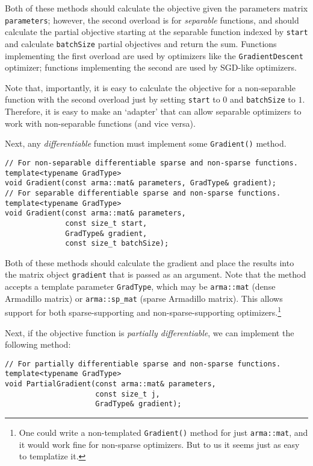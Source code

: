 \documentclass{article}
\begin{document}
Both of these methods should calculate the objective given the parameters
matrix {\tt parameters}; however, the second overload is for {\it separable}
functions, and should calculate the partial objective starting at the separable
function indexed by {\tt start} and calculate {\tt batchSize} partial objectives
and return the sum.  Functions implementing the first overload are used by
optimizers like the {\tt GradientDescent} optimizer; functions implementing the
second are used by SGD-like optimizers.

Note that, importantly, it is easy to calculate the objective for a
non-separable function with the second overload just by setting {\tt start} to
$0$ and {\tt batchSize} to $1$.  Therefore, it is easy to make an `adapter' that
can allow separable optimizers to work with non-separable functions (and vice
versa).

Next, any {\it differentiable} function must implement some {\tt Gradient()}
method.

\vspace*{-0.3em}
\begin{verbatim}
// For non-separable differentiable sparse and non-sparse functions.
template<typename GradType>
void Gradient(const arma::mat& parameters, GradType& gradient);
// For separable differentiable sparse and non-sparse functions.
template<typename GradType>
void Gradient(const arma::mat& parameters,
              const size_t start,
              GradType& gradient,
              const size_t batchSize);
\end{verbatim}
\vspace*{-0.3em}

Both of these methods should calculate the gradient and place the results into
the matrix object {\tt gradient} that is passed as an argument.
Note that the method accepts a template
parameter {\tt GradType}, which may be {\tt arma::mat} (dense Armadillo matrix)
or {\tt arma::sp\_mat} (sparse Armadillo matrix).  This allows support for both
sparse-supporting and non-sparse-supporting optimizers.\footnote{One could write
a non-templated {\tt Gradient()} method for just {\tt arma::mat}, and it would
work fine for non-sparse optimizers.  But to us it seems just as easy to
templatize it.}

Next, if the objective function is {\it partially differentiable}, we can
implement the following method:

\vspace*{-0.3em}
\begin{verbatim}
// For partially differentiable sparse and non-sparse functions.
template<typename GradType>
void PartialGradient(const arma::mat& parameters,
                     const size_t j,
                     GradType& gradient);
\end{verbatim}
\vspace*{-0.3em}
\end{document}

